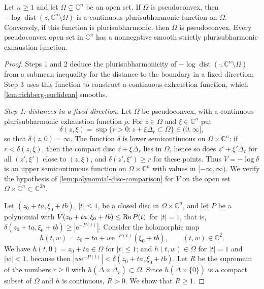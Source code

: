 \begin{theorem}\label{thm:oka-boundary-distance}
Let $n\ge1$ and let $\Omega\subsetneq\mathbb C^n$ be an open set. If $\Omega$ is pseudoconvex, then $-\log\operatorname{dist}(z,\mathbb C^n\setminus\Omega)$ is a continuous plurisubharmonic function on $\Omega$. Conversely, if this function is plurisubharmonic, then $\Omega$ is pseudoconvex. Every pseudoconvex open set in $\mathbb C^n$ has a nonnegative smooth strictly plurisubharmonic exhaustion function.
\end{theorem}
\begin{proof}
Steps 1 and 2 deduce the plurisubharmonicity of $-\log\operatorname{dist}(\cdot,\mathbb C^n\setminus\Omega)$ from a submean inequality for the distance to the boundary in a fixed direction; Step 3 uses this function to construct a continuous exhaustion function, which \cref{lem:richberg-euclidean} smooths.

\emph{Step 1: distances in a fixed direction.} Let $\Omega$ be pseudoconvex, with a continuous plurisubharmonic exhaustion function $\rho$. For $z\in\Omega$ and $\xi\in\mathbb C^n$ put
\[
 \delta(z,\xi)=\sup\{r>0:z+\xi\Delta_r\subset\Omega\}\in(0,\infty],
\]
so that $\delta(z,0)=\infty$. The function $\delta$ is lower semicontinuous on $\Omega\times\mathbb C^n$: if $r<\delta(z,\xi)$, then the compact disc $z+\xi\overline\Delta_r$ lies in $\Omega$, hence so does $z'+\xi'\overline\Delta_r$ for all $(z',\xi')$ close to $(z,\xi)$, and $\delta(z',\xi')\ge r$ for these points. Thus $V=-\log\delta$ is an upper semicontinuous function on $\Omega\times\mathbb C^n$ with values in $[-\infty,\infty)$. We verify the hypothesis of \cref{lem:polynomial-disc-comparison} for $V$ on the open set $\Omega\times\mathbb C^n\subset\mathbb C^{2n}$.

Let $(z_0+ta,\xi_0+tb)$, $|t|\le1$, be a closed disc in $\Omega\times\mathbb C^n$, and let $P$ be a polynomial with $V(z_0+ta,\xi_0+tb)\le\operatorname{Re} P(t)$ for $|t|=1$, that is, $\delta(z_0+ta,\xi_0+tb)\ge|\mathrm e^{-P(t)}|$. Consider the holomorphic map
\[
 h(t,w)=z_0+t a+w\mathrm e^{-P(t)}(\xi_0+t b),\qquad(t,w)\in\mathbb C^2.
\]
We have $h(t,0)=z_0+ta\in\Omega$ for $|t|\le1$; and $h(t,w)\in\Omega$ for $|t|=1$ and $|w|<1$, because then $|w\mathrm e^{-P(t)}|<\delta(z_0+ta,\xi_0+tb)$. Let $R$ be the supremum of the numbers $r\ge0$ with $h(\overline\Delta\times\overline\Delta_r)\subset\Omega$. Since $h(\overline\Delta\times\{0\})$ is a compact subset of $\Omega$ and $h$ is continuous, $R>0$. We show that $R\ge1$.


\end{proof}
